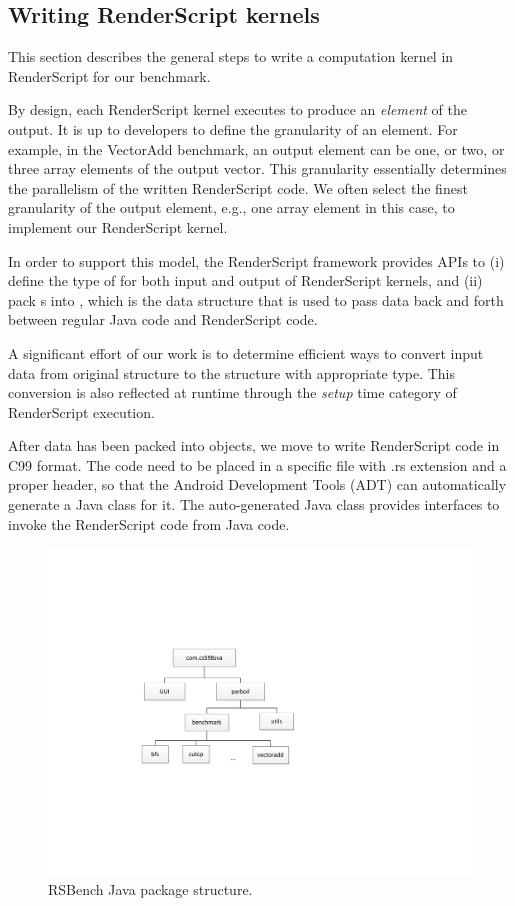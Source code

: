 \subsection*{Writing RenderScript kernels}
This section describes the general steps to write a computation kernel in
RenderScript for our benchmark.

By design, each RenderScript kernel executes to produce an \textit{element} of
the output. It is up to developers to define the granularity of an element. For
example, in the VectorAdd benchmark, an output element can be one, or two, or
three array elements of the output vector. This granularity essentially
determines the parallelism of the written RenderScript code. We often select the
finest granularity of the output element, e.g., one array element in this case,
to implement our RenderScript kernel.


In order to support this model, the RenderScript framework provides APIs to (i)
define the type of  for both input and output of RenderScript
kernels, and (ii) pack s into , which is the data
structure that is used to pass data back and forth between regular Java code and
RenderScript code.

A significant effort of our work is to determine efficient ways to convert input
data from original structure to the  structure with appropriate
 type. This conversion is also reflected at runtime through the
\textit{setup} time category of RenderScript execution.

After data has been packed into  objects, we move to write
RenderScript code in C99 format. The code need to be placed in a specific file
with .rs extension and a proper header, so that the Android Development Tools
(ADT) can automatically generate a Java class for it. The auto-generated Java
class provides interfaces to invoke the RenderScript code from Java code.

\begin{figure}[t!]
\includegraphics[scale=0.65]{figs/package_diagram.pdf}
\caption{RSBench Java package structure.}
\label{fig:package_structure}
\centering
\end{figure}


